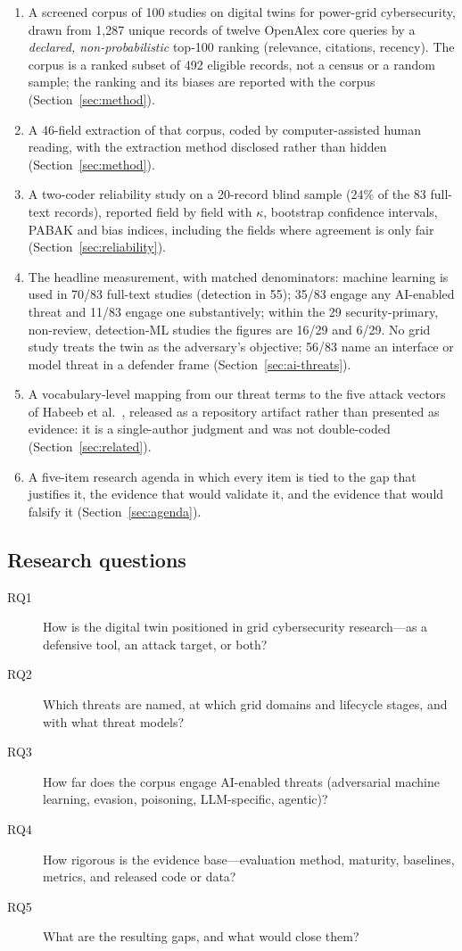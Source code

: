 \documentclass[preprint,12pt]{elsarticle}
\renewcommand{\_}{\plainunderscore\allowbreak}
\begin{document}
\begin{enumerate}
  \item A screened corpus of 100 studies on digital twins for power-grid cybersecurity,
  drawn from 1{,}287 unique records of twelve OpenAlex core queries by a \emph{declared,
  non-probabilistic} top-100 ranking (relevance, citations, recency). The corpus is a
  ranked subset of 492 eligible records, not a census or a random sample; the ranking and
  its biases are reported with the corpus (Section~\ref{sec:method}).
  \item A 46-field extraction of that corpus, coded by computer-assisted human reading, with
  the extraction method disclosed rather than hidden (Section~\ref{sec:method}).
  \item A two-coder reliability study on a 20-record blind sample (24\% of the 83
  full-text records), reported field by field with $\kappa$, bootstrap confidence
  intervals, PABAK and bias indices, including the fields where agreement is only fair
  (Section~\ref{sec:reliability}).
  \item The headline measurement, with matched denominators: machine learning is used in
  70/83 full-text studies (detection in 55); 35/83 engage any AI-enabled threat and 11/83
  engage one substantively; within the 29 security-primary, non-review, detection-ML
  studies the figures are 16/29 and 6/29. No grid study treats the twin as the
  adversary's objective; 56/83 name an interface or model threat in a defender frame
  (Section~\ref{sec:ai-threats}).
  \item A vocabulary-level mapping from our threat terms to the five attack vectors of
  Habeeb et al.\ \cite{habeeb2026}, released as a repository artifact
  rather than presented as evidence: it is a
  single-author judgment and was not double-coded (Section~\ref{sec:related}).
  \item A five-item research agenda in which every item is tied to the gap that justifies it,
  the evidence that would validate it, and the evidence that would falsify it
  (Section~\ref{sec:agenda}).
\end{enumerate}

\subsection{Research questions}

\begin{description}
  \item[RQ1] How is the digital twin positioned in grid cybersecurity research---as a defensive
  tool, an attack target, or both?
  \item[RQ2] Which threats are named, at which grid domains and lifecycle stages, and with what
  threat models?
  \item[RQ3] How far does the corpus engage AI-enabled threats (adversarial machine learning,
  evasion, poisoning, LLM-specific, agentic)?
  \item[RQ4] How rigorous is the evidence base---evaluation method, maturity, baselines,
  metrics, and released code or data?
  \item[RQ5] What are the resulting gaps, and what would close them?
\end{description}
\end{document}
